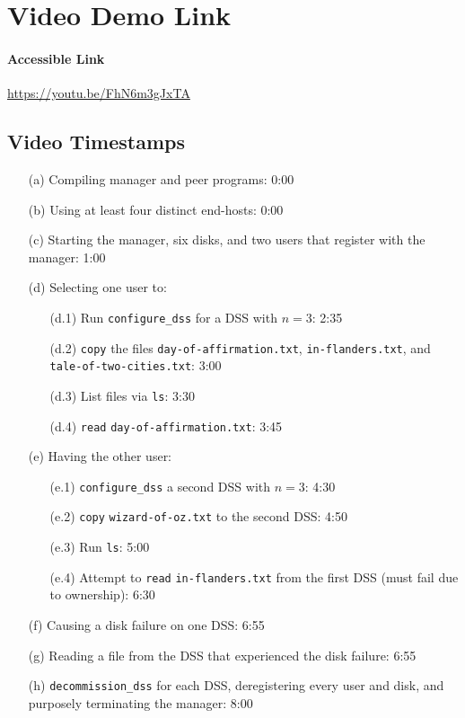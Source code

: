 \documentclass[11pt]{article}
\begin{document}
\section{Video Demo Link}
\paragraph{Accessible Link} \url{https://youtu.be/FhN6m3gJxTA}

\subsection{Video Timestamps}
\begin{itemize}
  \item[(a)] Compiling manager and peer programs: 0:00
  \item[(b)] Using at least four distinct end-hosts: 0:00
  \item[(c)] Starting the manager, six disks, and two users that register with the manager: 1:00
  \item[(d)] Selecting one user to:
  \begin{itemize}
    \item[(d.1)] Run \texttt{configure\_dss} for a DSS with $n = 3$: 2:35
    \item[(d.2)] \texttt{copy} the files \texttt{day-of-affirmation.txt}, \texttt{in-flanders.txt}, and \texttt{tale-of-two-cities.txt}: 3:00
    \item[(d.3)] List files via \texttt{ls}: 3:30
    \item[(d.4)] \texttt{read} \texttt{day-of-affirmation.txt}: 3:45
  \end{itemize}
  \item[(e)] Having the other user:
  \begin{itemize}
    \item[(e.1)] \texttt{configure\_dss} a second DSS with $n = 3$: 4:30
    \item[(e.2)] \texttt{copy} \texttt{wizard-of-oz.txt} to the second DSS: 4:50
    \item[(e.3)] Run \texttt{ls}: 5:00
    \item[(e.4)] Attempt to \texttt{read} \texttt{in-flanders.txt} from the first DSS (must fail due to ownership): 6:30
  \end{itemize}
  \item[(f)] Causing a disk failure on one DSS: 6:55
  \item[(g)] Reading a file from the DSS that experienced the disk failure: 6:55
  \item[(h)] \texttt{decommission\_dss} for each DSS, deregistering every user and disk, and purposely terminating the manager: 8:00
\end{itemize}
\end{document}
